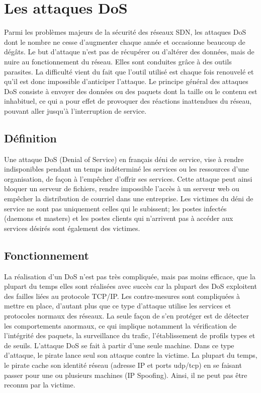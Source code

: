 \section{Les attaques DoS}
Parmi les problèmes majeurs de la sécurité des réseaux SDN, les attaques DoS dont le nombre ne cesse d’augmenter chaque année et occasionne beaucoup de dégâts. Le but d’attaque n’est pas de récupérer ou d’altérer des données, mais de nuire au fonctionnement du réseau. Elles sont conduites grâce à des outils parasites. La difficulté vient du fait que l’outil utilisé est chaque fois renouvelé et qu’il est donc impossible d’anticiper l’attaque. Le principe général des attaques DoS consiste à envoyer des données ou des paquets dont la taille ou le contenu est inhabituel, ce qui a pour effet de provoquer des réactions inattendues du réseau, pouvant aller jusqu’à l’interruption de service.

\subsection{Définition}
Une attaque DoS (Denial of Service) en français déni de service, vise à rendre indisponibles pendant un temps indéterminé les services ou les ressources d’une organisation, de façon à l’empêcher d’offrir ses services. Cette attaque peut ainsi bloquer un serveur de fichiers, rendre impossible l’accès à un serveur web ou empêcher la distribution de courriel dans une entreprise. Les victimes du déni de service ne sont pas uniquement celles qui le subissent; les postes infectés (daemons et masters) et les postes clients qui n’arrivent pas à accéder aux services désirés sont également des victimes.

\subsection{Fonctionnement}
La réalisation d’un DoS n’est pas très compliquée, mais pas moins efficace, que la plupart du temps elles sont réalisées avec succès car la plupart des DoS exploitent des failles liées au protocole TCP/IP. Les contre-mesures sont compliquées à mettre en place, d’autant plus que ce type d’attaque utilise les services et protocoles normaux des réseaux. La seule façon de s’en protéger est de détecter les comportements anormaux, ce qui implique notamment la vérification de l’intégrité des paquets, la surveillance du trafic, l’établissement de profils types et de seuils. 
L’attaque DoS se fait à partir d’une seule machine. Dans ce type d’attaque, le pirate lance seul son attaque contre la victime. La plupart du temps, le pirate cache son identité réseau (adresse IP et ports udp/tcp) en se faisant passer pour une ou plusieurs machines (IP Spoofing). Ainsi, il ne peut pas être reconnu par la victime.

